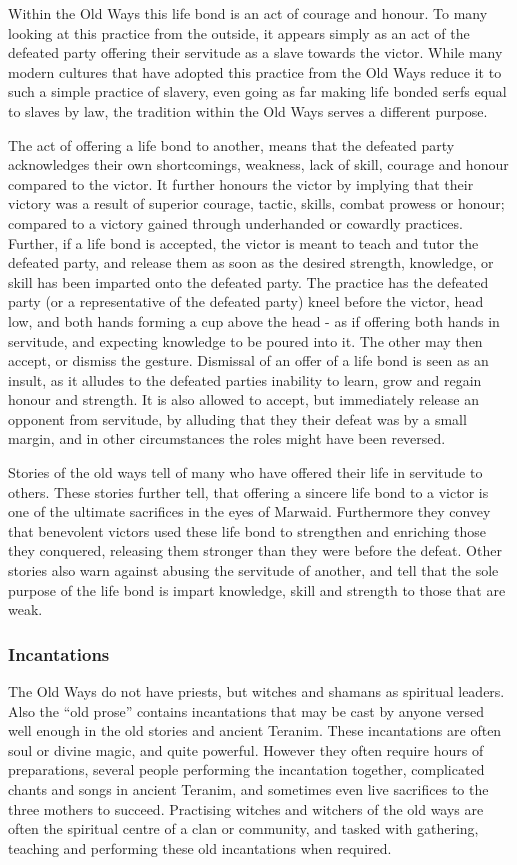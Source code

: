 Within the Old Ways this life bond is an act of courage and honour. To many
looking at this practice from the outside, it appears simply as an act of the
defeated party offering their servitude as a slave towards the victor. While
many modern cultures that have adopted this practice from the Old Ways reduce
it to such a simple practice of slavery, even going as far making life bonded
serfs equal to slaves by law, the tradition within the Old Ways serves a
different purpose.

The act of offering a life bond to another, means that the defeated party
acknowledges their own shortcomings, weakness, lack of skill, courage and
honour compared to the victor. It further honours the victor by implying that
their victory was a result of superior courage, tactic, skills, combat prowess
or honour; compared to a victory gained through underhanded or cowardly
practices. Further, if a life bond is accepted, the victor is meant to teach
and tutor the defeated party, and release them as soon as the desired
strength, knowledge, or skill has been imparted onto the defeated party. The
practice has the defeated party (or a representative of the defeated party)
kneel before the victor, head low, and both hands forming a cup above the head
- as if offering both hands in servitude, and expecting knowledge to be poured
into it. The other may then accept, or dismiss the gesture. Dismissal of an
offer of a life bond is seen as an insult, as it alludes to the defeated
parties inability to learn, grow and regain honour and strength. It is also
allowed to accept, but immediately release an opponent from servitude, by
alluding that they their defeat was by a small margin, and in other
circumstances the roles might have been reversed.

Stories of the old ways tell of many who have offered their life in servitude
to others. These stories further tell, that offering a sincere life bond to a
victor is one of the ultimate sacrifices in the eyes of Marwaid. Furthermore
they convey that benevolent victors used these life bond to strengthen
and enriching those they conquered, releasing them stronger than they were
before the defeat. Other stories also warn against abusing the servitude of
another, and tell that the sole purpose of the life bond is impart knowledge,
skill and strength to those that are weak.

\subsubsection{Incantations}

The Old Ways do not have priests, but witches and shamans as spiritual
leaders. Also the ``old prose'' contains incantations that may be cast by
anyone versed well enough in the old stories and ancient Teranim. These
incantations are often soul or divine magic, and quite powerful. However they
often require hours of preparations, several people performing the incantation
together, complicated chants and songs in ancient Teranim, and sometimes even
live sacrifices to the three mothers to succeed. Practising witches and
witchers of the old ways are often the spiritual centre of a clan or
community, and tasked with gathering, teaching and performing these old
incantations when required.
